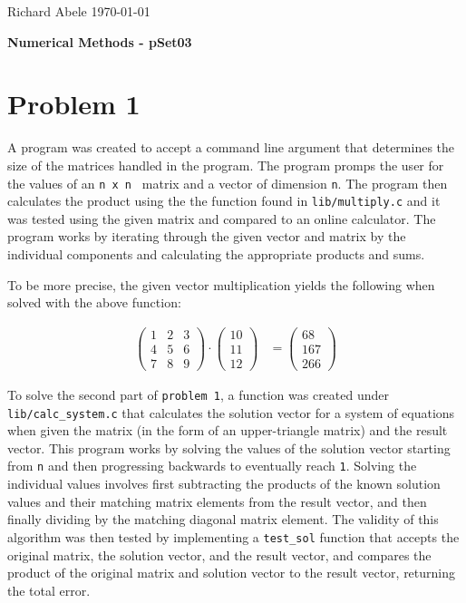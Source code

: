 \documentclass[12pt]{article}
\begin{document}
\noindent Richard Abele \hfill \today \\[30pt]
\centerline{ \Large{ \textbf{ Numerical Methods - pSet03 }}}

\section{Problem 1}
\label{sec:prob1}

A program was created to accept a command line argument that determines the size of the matrices handled in the program. The program promps the user for the values of an \texttt{n x n } matrix and a vector of dimension \texttt{n}. The program then calculates the product using the the function found in \texttt{lib/multiply.c} and it was tested using the given matrix and compared to an online calculator. The program works by iterating through the given vector and matrix by the individual components and calculating the appropriate products and sums. 

To be more precise, the given vector multiplication yields the following when solved with the above function:

\begin{align*}
	\begin{pmatrix}
		1 & 2 & 3\\
		4 & 5 & 6\\
		7 & 8 & 9
	\end{pmatrix} \cdot \begin{pmatrix}
		10\\
		11\\
		12
	\end{pmatrix} & =  \begin{pmatrix}
		68\\
		167\\
		266
	\end{pmatrix}
\end{align*}

To solve the second part of \texttt{problem 1}, a function was created under \texttt{lib/calc_system.c} that calculates the solution vector for a system of equations when given the matrix (in the form of an upper-triangle matrix) and the result vector. This program works by solving the values of the solution vector starting from \texttt{n} and then progressing backwards to eventually reach \texttt{1}. Solving the individual values involves first subtracting the products of the known solution values and their matching matrix elements from the result vector, and then finally dividing by the matching diagonal matrix element. The validity of this algorithm was then tested by implementing a \texttt{test_sol} function that accepts the original matrix, the solution vector, and the result vector, and compares the product of the original matrix and solution vector to the result vector, returning the total error. 
\end{document}
